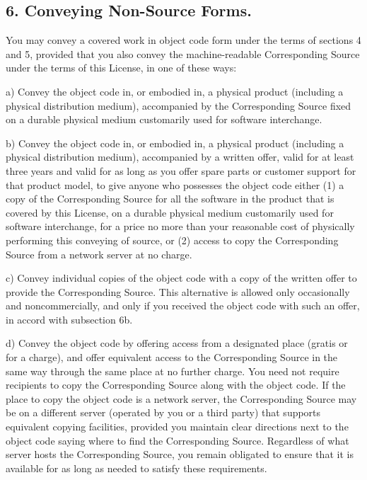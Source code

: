 \documentclass[letterpaper,10pt,english]{sphinxmanual}
\begin{document}
\subsection{6. Conveying Non-Source Forms.}
\label{license:conveying-non-source-forms}
You may convey a covered work in object code form under the terms
of sections 4 and 5, provided that you also convey the
machine-readable Corresponding Source under the terms of this License,
in one of these ways:

a) Convey the object code in, or embodied in, a physical product
(including a physical distribution medium), accompanied by the
Corresponding Source fixed on a durable physical medium
customarily used for software interchange.

b) Convey the object code in, or embodied in, a physical product
(including a physical distribution medium), accompanied by a
written offer, valid for at least three years and valid for as
long as you offer spare parts or customer support for that product
model, to give anyone who possesses the object code either (1) a
copy of the Corresponding Source for all the software in the
product that is covered by this License, on a durable physical
medium customarily used for software interchange, for a price no
more than your reasonable cost of physically performing this
conveying of source, or (2) access to copy the
Corresponding Source from a network server at no charge.

c) Convey individual copies of the object code with a copy of the
written offer to provide the Corresponding Source.  This
alternative is allowed only occasionally and noncommercially, and
only if you received the object code with such an offer, in accord
with subsection 6b.

d) Convey the object code by offering access from a designated
place (gratis or for a charge), and offer equivalent access to the
Corresponding Source in the same way through the same place at no
further charge.  You need not require recipients to copy the
Corresponding Source along with the object code.  If the place to
copy the object code is a network server, the Corresponding Source
may be on a different server (operated by you or a third party)
that supports equivalent copying facilities, provided you maintain
clear directions next to the object code saying where to find the
Corresponding Source.  Regardless of what server hosts the
Corresponding Source, you remain obligated to ensure that it is
available for as long as needed to satisfy these requirements.
\end{document}
